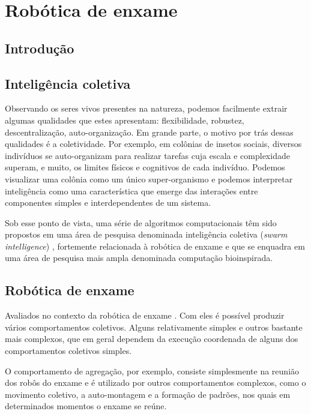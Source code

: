 \chapter{Robótica de enxame}
\label{swarm}

\section{Introdução}

\section{Inteligência coletiva}

Observando os seres vivos presentes na natureza, podemos facilmente extrair algumas qualidades que estes apresentam: flexibilidade, robustez, descentralização, auto-organização. Em grande parte, o motivo por trás dessas qualidades é a coletividade. Por exemplo, em colônias de insetos sociais, diversos indivíduos se auto-organizam para realizar tarefas cuja  escala e complexidade superam, e muito, os limites físicos e cognitivos de cada indivíduo. Podemos visualizar uma colônia como um único super-organismo \cite{trianni2011swarm} e podemos interpretar inteligência como uma característica que emerge das interações entre componentes simples e interdependentes de um sistema.

Sob esse ponto de vista, uma série de algoritmos computacionais têm sido propostos em uma área de pesquisa denominada inteligência coletiva (\textit{swarm intelligence}) \cite{bonabeau1999swarm} \cite{kennedy2001swarm}, fortemente relacionada à robótica de enxame e que se enquadra em uma área de pesquisa mais ampla denominada computação bioinspirada.

\section{Robótica de enxame}

Avaliados no contexto da robótica de enxame \cite{navarro2012introduction}. Com eles é possível produzir vários comportamentos coletivos. Alguns relativamente simples e outros bastante mais complexos, que em geral dependem da execução coordenada de alguns dos comportamentos coletivos simples.

O comportamento de agregação, por exemplo, consiste simplesmente na reunião dos
robôs do enxame e é utilizado por outros comportamentos complexos, como o movimento
coletivo, a auto-montagem e a formação de padrões, nos quais em determinados momentos o
enxame se reúne.

